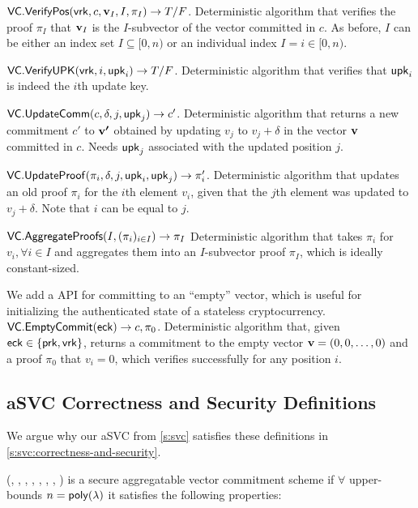 \api $\mathsf{VC}.\mathsf{VerifyPos}(\mathsf{vrk}, c, \bm{\mathrm{v}}_I, I, \pi_I) \rightarrow T/F$.
Deterministic algorithm that verifies the proof $\pi_I$ that $\bm{\mathrm{v}}_I$ is the $I$-subvector of the vector committed in $c$.
As before, $I$ can be either an index set $I\subseteq [0,n)$ or an individual index $I = i\in [0,n)$.

\api $\mathsf{VC}.\mathsf{VerifyUPK}(\mathsf{vrk}, i, \mathsf{upk}_i) \rightarrow T/F$.
Deterministic algorithm that verifies that $\mathsf{upk}_i$ is indeed the $i$th update key.

\api $\mathsf{VC}.\mathsf{UpdateComm}(c, \delta, j,\mathsf{upk}_j)\rightarrow c'$.
Deterministic algorithm that returns a new commitment $c'$ to $\bm{\mathrm{v'}}$ obtained by updating $v_j$ to $v_j+\delta$ in the vector $\bm{\mathrm{v}}$ committed in $c$.
Needs $\mathsf{upk}_j$ associated with the updated position $j$.

\api $\mathsf{VC}.\mathsf{UpdateProof}(\pi_i, \delta, j, \mathsf{upk}_i, \mathsf{upk}_j)\rightarrow \pi'_i$.
Deterministic algorithm that updates an old proof $\pi_i$ for the $i$th element $v_i$, given that the $j$th element was updated to $v_j + \delta$.
Note that $i$ can be equal to $j$.

\api $\mathsf{VC}.\mathsf{AggregateProofs}(I, (\pi_i)_{i\in I})\rightarrow \pi_I$
Deterministic algorithm that takes $\pi_i$ for $v_i,\forall i\in I$ and aggregates them into an $I$-subvector proof $\pi_I$, which is ideally constant-sized.

We add a \vccommitempty API for committing to an ``empty'' vector, which is useful for initializing the authenticated state of a stateless cryptocurrency.
\\

\api $\mathsf{VC}.\mathsf{EmptyCommit}(\mathsf{eck})\rightarrow c, \pi_0$.
Deterministic algorithm that, given $\mathsf{eck}\in \{\mathsf{prk}, \mathsf{vrk}\}$, returns a commitment to the empty vector $\bm{\mathrm{v}}=(0,0,\dots,0)$ and a proof $\pi_0$ that $v_i = 0$, which verifies successfully for any position $i$.

\subsection{aSVC Correctness and Security Definitions}
\label{s:prelim:vcs:correctness-and-security}

We argue why our aSVC from \cref{s:svc} satisfies these definitions in \cref{s:svc:correctness-and-security}.

\begin{definition}
    \label{def:vc}
    (\vcsetup, \vccommit, \vcopenpos, \vcverifypos, \vcverifyupk, \vccommupdate, \vcproofupdate, \vcaggregateproofs) is a secure aggregatable vector commitment scheme if
    $\forall$ upper-bounds $n=\mathsf{poly}(\lambda)$
    it satisfies the following properties:
\end{definition}

